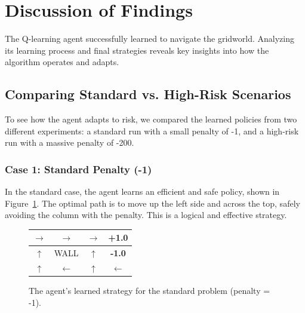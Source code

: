 \documentclass[11pt, a4paper]{article}
\begin{document}
\section{Discussion of Findings}
The Q-learning agent successfully learned to navigate the gridworld. Analyzing its learning process and final strategies reveals key insights into how the algorithm operates and adapts.

\subsection{Comparing Standard vs. High-Risk Scenarios}
To see how the agent adapts to risk, we compared the learned policies from two different experiments: a standard run with a small penalty of -1, and a high-risk run with a massive penalty of -200.

\subsubsection{Case 1: Standard Penalty (-1)}
In the standard case, the agent learns an efficient and safe policy, shown in Figure~\ref{fig:policy_standard}. The optimal path is to move up the left side and across the top, safely avoiding the column with the penalty. This is a logical and effective strategy.

\begin{figure}[H]
    \centering
    \begin{tabular}{|c|c|c|c|}
        \hline
        $\rightarrow$ & $\rightarrow$ & $\rightarrow$ & \textbf{+1.0} \\
        \hline
        $\uparrow$ & WALL & $\uparrow$ & \textbf{-1.0} \\
        \hline
        $\uparrow$ & $\leftarrow$ & $\uparrow$ & $\leftarrow$ \\
        \hline
    \end{tabular}
    \caption{The agent's learned strategy for the standard problem (penalty = -1).}\label{fig:policy_standard}
\end{figure}
\end{document}

